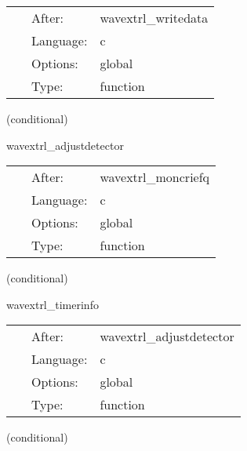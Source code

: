  \begin{tabular*}{160mm}{cll} 
~ & After:  & wavextrl\_writedata \\ 
~ & Language:  & c \\ 
~ & Options:  & global \\ 
~ & Type:  & function \\ 
\end{tabular*} 


\vspace{5mm}

   (conditional) 

\hspace{5mm} wavextrl\_adjustdetector 

\hspace{5mm}{\it decrease current\_detector, go the the next detector } 


\hspace{5mm}

 \begin{tabular*}{160mm}{cll} 
~ & After:  & wavextrl\_moncriefq \\ 
~ & Language:  & c \\ 
~ & Options:  & global \\ 
~ & Type:  & function \\ 
\end{tabular*} 


\vspace{5mm}

   (conditional) 

\hspace{5mm} wavextrl\_timerinfo 

\hspace{5mm}{\it output timer info if requested } 


\hspace{5mm}

 \begin{tabular*}{160mm}{cll} 
~ & After:  & wavextrl\_adjustdetector \\ 
~ & Language:  & c \\ 
~ & Options:  & global \\ 
~ & Type:  & function \\ 
\end{tabular*} 


\vspace{5mm}

   (conditional) 

